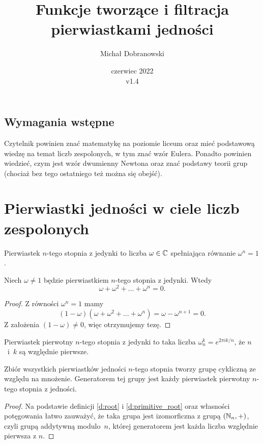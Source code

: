 \documentclass{scrartcl}
\title{Funkcje tworzące i filtracja pierwiastkami jedności}
\author{Michał Dobranowski}
\date{czerwiec 2022 \\ v1.4}
\begin{document}
    \maketitle
    \subsection*{Wymagania wstępne}
    Czytelnik powinien znać matematykę na poziomie liceum oraz mieć podstawową wiedzę na temat liczb zespolonych, w tym znać wzór Eulera. Ponadto powinien wiedzieć, czym jest wzór dwumienny Newtona oraz znać podstawy teorii grup (chociaż bez tego ostatniego też można się obejść).
    \tableofcontents
    \newpage

\section{Pierwiastki jedności w ciele liczb zespolonych}
    \begin{definition}
        \label{d:root}
        Pierwiastek $n$-tego stopnia z jedynki to liczba $\omega \in \mathbb C$ spełniająca równanie $\omega^n = 1$.
    \end{definition}

    \begin{lemma}
        \label{l:roots_sum}
        Niech $\omega \neq 1$ będzie pierwiastkiem $n$-tego stopnia z jedynki. Wtedy
        $$ \omega + \omega^2 + \ldots + \omega^n = 0. $$
    \end{lemma}
    \begin{proof}
        Z równości $\omega^n = 1$ mamy
        $$ (1 - \omega)(\omega + \omega^2 + \ldots + \omega^n) = \omega - \omega^{n+1} = 0. $$
        Z założenia $(1 - \omega) \neq 0$, więc otrzymujemy tezę.
    \end{proof}

    \begin{definition}
        \label{d:primitive_root}
        Pierwiastek pierwotny $n$-tego stopnia z jedynki to taka liczba $\omega_n^k = e^{2\pi i k / n}$, że $n$~i~$k$ są względnie pierwsze.
    \end{definition}

    \begin{lemma}
        \label{l:roots_group}
        Zbiór wszystkich pierwiastków jedności $n$-tego stopnia tworzy grupę cykliczną ze względu na mnożenie. Generatorem tej grupy jest każdy pierwiastek pierwotny $n$-tego stopnia z jedności.
    \end{lemma}
    \begin{proof}
        Na podstawie definicji \ref{d:root} i \ref{d:primitive_root} oraz własności potęgowania łatwo zauważyć, że taka grupa jest izomorficzna z grupą $(\mathbb N_n, +)$, czyli grupą addytywną modulo~$n$, której generatorem jest każda liczba względnie pierwsza z $n$.
    \end{proof}
\end{document}
